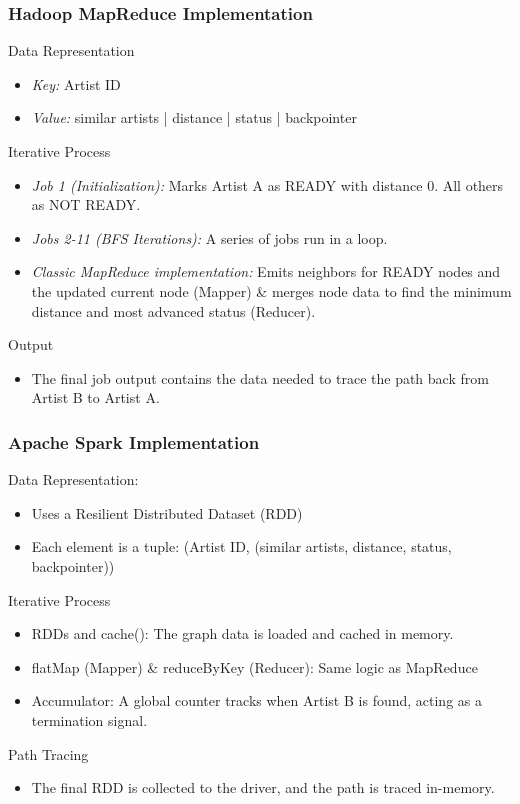 \documentclass{beamer}
\begin{document}
\begin{frame}[fragile]
    \frametitle{{Hadoop MapReduce Implementation}}

    Data Representation
    \begin{itemize}
        \item \textit{Key:} Artist ID
        \item \textit{Value:} similar artists | distance | status | backpointer
    \end{itemize}
    Iterative Process
    \begin{itemize}
        \item \textit{Job 1 (Initialization):} Marks Artist A as READY with distance 0. All others as NOT READY.
        \item \textit{Jobs 2-11 (BFS Iterations):} A series of jobs run in a loop.
        \item \textit{Classic MapReduce implementation:} Emits neighbors for READY nodes and the updated current node (Mapper) \& merges node data to find the minimum distance and most advanced status (Reducer).
    \end{itemize}
    Output 
    \begin{itemize}
        \item The final job output contains the data needed to trace the path back from Artist B to Artist A.
    \end{itemize}
\end{frame}

\begin{frame}[fragile]
    \frametitle{Apache Spark Implementation}

    Data Representation:
    \begin{itemize}
        \item Uses a Resilient Distributed Dataset (RDD)
        \item Each element is a tuple: (Artist ID, (similar artists, distance, status, backpointer))
    \end{itemize}
    Iterative Process
    \begin{itemize}
        \item RDDs and cache(): The graph data is loaded and cached in memory.
        \item flatMap (Mapper) \& reduceByKey (Reducer): Same logic as MapReduce
        \item Accumulator: A global counter tracks when Artist B is found, acting as a termination signal.
    \end{itemize}
    Path Tracing
    \begin{itemize}
        \item The final RDD is collected to the driver, and the path is traced in-memory.
    \end{itemize}
\end{frame}
\end{document}
